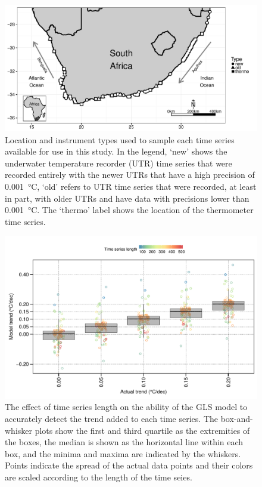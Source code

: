 \documentclass[]{ametsoc}
\begin{document}
%
\begin{figure}
\centering \includegraphics[width=1.0\textwidth]{figure01}
\caption[\small Location and instrument types used to sample each time series available for use in this study]{Location and instrument types used to sample each time series available for use in this study. In the legend, `new' shows the underwater temperature recorder (UTR) time series that were recorded entirely with the newer UTRs that have a high precision of \SI{0.001}{\degreeCelsius}, `old' refers to UTR time series that were recorded, at least in part, with older UTRs and have data with precisions lower than \SI{0.001}{\degreeCelsius}. The `thermo' label shows the location of the thermometer time series.}
\label{figure01}
\end{figure}

\begin{figure}
\centering \includegraphics[width=01.0\textwidth]{figure02}
\caption[\small The effect of time series length on the ability of the GLS model to accurately detect the trend added to a time series]{The effect of time series length on the ability of the GLS model to accurately detect the trend added to each time series. The box-and-whisker plots show the first and third quartile as the extremities of the boxes, the median is shown as the horizontal line within each box, and the minima and maxima are indicated by the whiskers. Points indicate the spread of the actual data points and their colors are scaled according to the length of the time seies.}
\label{figure02}
\end{figure}
\end{document}
